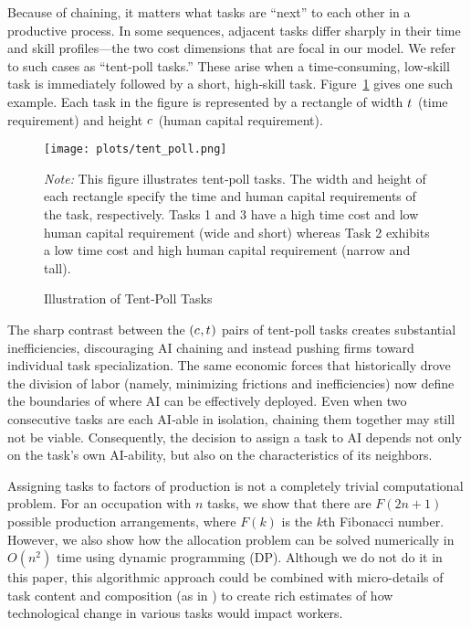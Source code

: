 \documentclass{article}
\theoremstyle{plain}
\theoremstyle{plain}
\begin{document}
Because of chaining, it matters what tasks are ``next'' to each other in a productive process.
In some sequences, adjacent tasks differ sharply in their time and skill profiles---the two cost dimensions that are focal in our model.
We refer to such cases as ``tent‐poll tasks.''
These arise when a time‐consuming, low‐skill task is immediately followed by a short, high‐skill task.
Figure~\ref{fig:tent_poll} gives one such example.
Each task in the figure is represented by a rectangle of width $t_{}$ (time requirement) and height $c_{}$ (human capital requirement).
\begin{figure}[h!]
  \caption{Illustration of Tent‐Poll Tasks} 
  \label{fig:tent_poll}
  \begin{center}
    \texttt{[image: plots/tent\_poll.png]}
  \end{center}
  \begin{footnotesize}
    \emph{Note:} This figure illustrates tent‐poll tasks.  
    The width and height of each rectangle specify the time and human capital requirements of the task, respectively.
    Tasks 1 and 3 have a high time cost and low human capital requirement (wide and short) whereas Task 2 exhibits a low time cost and high human capital requirement (narrow and tall).  
  \end{footnotesize}
\end{figure}
The sharp contrast between the $(c_{}, t_{})$ pairs of tent-poll tasks creates substantial inefficiencies, discouraging AI chaining and instead pushing firms toward individual task specialization.
The same economic forces that historically drove the division of labor (namely, minimizing frictions and inefficiencies) now define the boundaries of where AI can be effectively deployed.
Even when two consecutive tasks are each AI‐able in isolation, chaining them together may still not be viable.
Consequently, the decision to assign a task to AI depends not only on the task's own AI-ability, but also on the characteristics of its neighbors.

Assigning tasks to factors of production is not a completely trivial computational problem.
For an occupation with $n$ tasks, we show that there are $F(2n + 1)$ possible production arrangements, where $F(k)$ is the $k$th Fibonacci number.
However, we also show how the allocation problem can be solved numerically in $O(n^2)$ time using dynamic programming (DP).
Although we do not do it in this paper, this algorithmic approach could be combined with micro-details of task content and composition (as in \cite{frey2017future, felten2021occupational, eloundou2023gpts}) to create rich estimates of how technological change in various tasks would impact workers.
\end{document}
